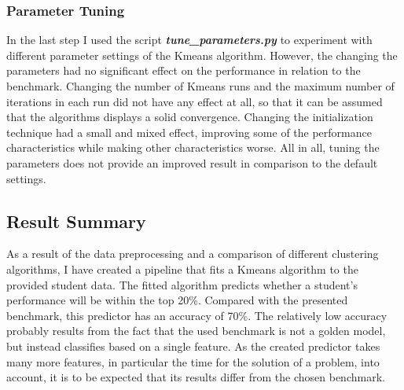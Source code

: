 \subsubsection{Parameter Tuning}
In the last step I used the script \textbf{\emph{tune\_parameters.py}} to experiment with different parameter settings of the Kmeans algorithm. However, the changing the parameters had no significant effect on the performance in relation to the benchmark. Changing the number of Kmeans runs and the maximum number of iterations in each run did not have any effect at all, so that it can be assumed that the algorithms displays a solid convergence. Changing the initialization technique had a small and mixed effect, improving some of the performance characteristics while making other characteristics worse. All in all, tuning the parameters does not provide an improved result in comparison to the default settings. 

\subsection{Result Summary}
As a result of the data preprocessing and a comparison of different clustering algorithms, I have created a pipeline that fits a Kmeans algorithm to the provided student data. The fitted algorithm predicts whether a student's performance will be within the top 20\%. Compared with the presented benchmark, this predictor has an accuracy of 70\%. The relatively low accuracy probably results from the fact that the used benchmark is not a golden model, but instead classifies based on a single feature. As the created predictor takes many more features, in particular the time for the solution of a problem, into account, it is to be expected that its results differ from the chosen benchmark.
